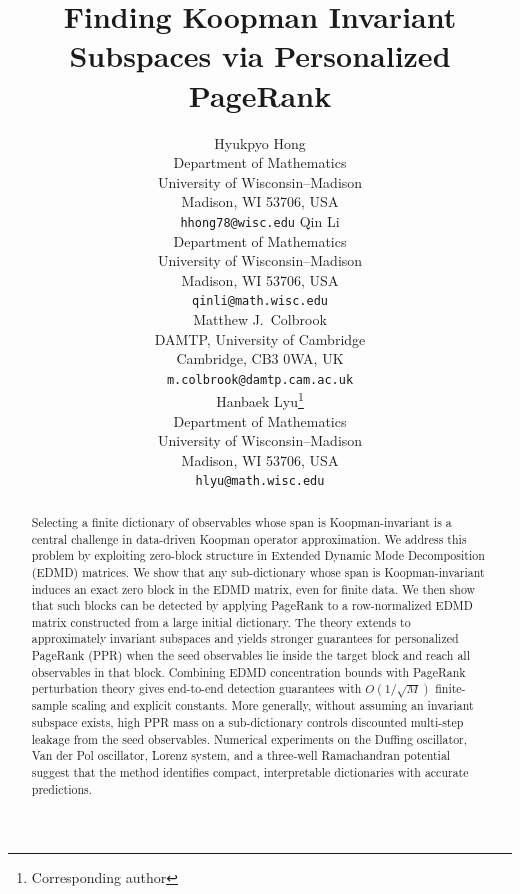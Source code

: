 \documentclass{article}
\title{Finding Koopman Invariant Subspaces via Personalized PageRank}
\author{
	Hyukpyo Hong \\
	Department of Mathematics \\
	University of Wisconsin--Madison \\
	Madison, WI 53706, USA \\
    \texttt{hhong78@wisc.edu}
    \And
    Qin Li \\
	Department of Mathematics \\
	University of Wisconsin--Madison \\
	Madison, WI 53706, USA \\
    \texttt{qinli@math.wisc.edu} \\
	\And
	Matthew J.~Colbrook \\
	DAMTP, University of Cambridge \\
	Cambridge, CB3 0WA, UK \\
    \texttt{m.colbrook@damtp.cam.ac.uk} \\
	\And
	Hanbaek Lyu\thanks{Corresponding author} \\
	Department of Mathematics \\
	University of Wisconsin--Madison \\
	Madison, WI 53706, USA \\
    \texttt{hlyu@math.wisc.edu}
}
\theoremstyle{plain}
\theoremstyle{definition}
\newcommand{\arXivtag}[1][]{#1}
\begin{document}
	\maketitle
    \vspace{-5mm}
	\begin{abstract}
		Selecting a finite dictionary of observables whose span is Koopman-invariant is a central challenge in data-driven Koopman operator approximation. We address this problem by exploiting zero-block structure in Extended Dynamic Mode Decomposition (EDMD) matrices. We show that any sub-dictionary whose span is Koopman-invariant induces an exact zero block in the EDMD matrix, even for finite data. We then show that such blocks can be detected by applying PageRank to a row-normalized EDMD matrix constructed from a large initial dictionary. The theory extends to approximately invariant subspaces and yields stronger guarantees for personalized PageRank (PPR) when the seed observables lie inside the target block and reach all observables in that block. Combining EDMD concentration bounds with PageRank perturbation theory gives end-to-end detection guarantees with $O(\arXivtag[1/\sqrt{M}])$ finite-sample scaling and explicit constants. More generally, without assuming an invariant subspace exists, high PPR mass on a sub-dictionary controls discounted multi-step leakage from the seed observables. Numerical experiments on the Duffing oscillator, Van der Pol oscillator, Lorenz system, and a three-well Ramachandran potential suggest that the method identifies compact, interpretable dictionaries with accurate predictions.
	\end{abstract}
\end{document}
